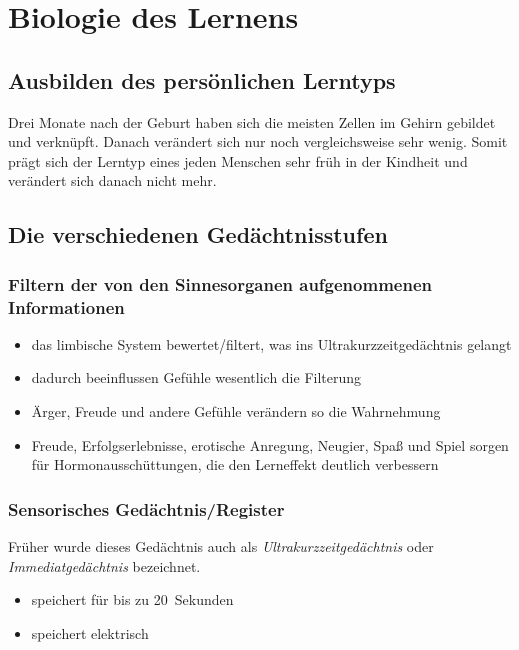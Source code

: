 \section{Biologie des Lernens}

\subsection{Ausbilden des persönlichen Lerntyps}
Drei Monate nach der Geburt haben sich die meisten Zellen im Gehirn gebildet und verknüpft. Danach verändert sich nur noch vergleichsweise sehr wenig. Somit prägt sich der Lerntyp eines jeden Menschen sehr früh in der Kindheit und verändert sich danach nicht mehr.

\subsection{Die verschiedenen Gedächtnisstufen}
\subsubsection{Filtern der von den Sinnesorganen aufgenommenen Informationen}
\begin{itemize}
  \item das limbische System bewertet/filtert, was ins Ultrakurzzeitgedächtnis gelangt
  \item dadurch beeinflussen Gefühle wesentlich die Filterung
  \item Ärger, Freude und andere Gefühle verändern so die Wahrnehmung
  \item Freude, Erfolgserlebnisse, erotische Anregung, Neugier, Spaß und Spiel sorgen für Hormonausschüttungen, die den Lerneffekt deutlich verbessern
\end{itemize}

\subsubsection{Sensorisches Gedächtnis/Register}
Früher wurde dieses Gedächtnis auch als \emph{Ultrakurzzeitgedächtnis} oder \emph{Immediatgedächtnis} bezeichnet.

\begin{itemize}
  \item speichert für bis zu 20~Sekunden
  \item speichert elektrisch
\end{itemize}

